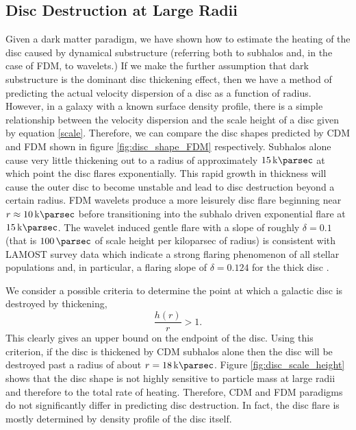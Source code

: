 \documentclass[usenatbib]{mnras}
\begin{document}
\subsection{Disc Destruction at Large Radii} \label{section:disc_destruction}

Given a dark matter paradigm, we have shown how to estimate the heating of the disc caused by dynamical substructure {\color{red} (referring both to subhalos and, in the case of FDM, to wavelets.) } If we make the further assumption that dark substructure is the dominant disc thickening effect, then we have a method of predicting the actual velocity dispersion of a disc as a function of radius. However, in a galaxy with a known surface density profile, there is a simple relationship between the velocity dispersion and the scale height of a disc given by equation \eqref{scale}. Therefore, we can compare the disc shapes predicted by CDM and FDM shown in figure \ref{fig:disc_shape_FDM} respectively. Subhalos alone cause very little thickening out to a radius of approximately $\SI{15}{\kilo \parsec}$ at which point the disc flares exponentially. This rapid growth in thickness will cause the outer disc to become unstable and lead to disc destruction beyond a certain radius. FDM wavelets produce a more leisurely disc flare beginning near $r \approx \SI{10}{\kilo \parsec}$ before transitioning into the subhalo driven exponential flare at $\SI{15}{\kilo \parsec}$. The wavelet induced gentle flare with a slope of roughly $\delta = 0.1$ (that is $\SI{100}{\parsec}$ of scale height per kiloparsec of radius) is consistent with LAMOST survey data which indicate a strong flaring phenomenon of all stellar populations and, in particular, a flaring slope of $\delta = 0.124$ for the thick disc \citep{LAMOST}. 
\par 
We consider a possible criteria to determine the point at which a galactic disc is destroyed by thickening,
\begin{equation}
\frac{h(r)}{r} > 1.
\end{equation}
This clearly gives an upper bound on the endpoint of the disc. Using this criterion, if the disc is thickened by CDM subhalos alone then the disc will be destroyed past a radius of about $r = \SI{18}{\kilo \parsec}$. Figure \ref{fig:disc_scale_height} shows that the disc shape is not highly sensitive to particle mass at large radii and therefore to the total rate of heating. Therefore, CDM and FDM paradigms do not significantly differ in predicting disc destruction. In fact, the disc flare is mostly determined by density profile of the disc itself.  
\end{document}
